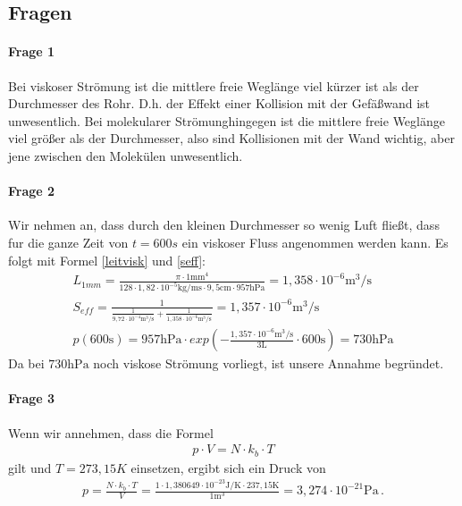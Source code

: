 \documentclass[11pt, a4paper]{article}
\begin{document}
    \subsection{Fragen}
    \paragraph{Frage 1}
    Bei viskoser Strömung ist die mittlere freie Weglänge viel kürzer ist als der Durchmesser des Rohr. D.h. der Effekt einer Kollision mit der Gefäßwand ist unwesentlich. Bei molekularer Strömunghingegen ist die mittlere freie Weglänge viel größer als der Durchmesser, also sind Kollisionen mit der Wand wichtig, aber jene zwischen den Molekülen unwesentlich.

    
    \paragraph{Frage 2}
    Wir nehmen an, dass durch den kleinen Durchmesser so wenig Luft fließt, dass fur die ganze Zeit von $t = 600s$ ein viskoser Fluss angenommen werden kann. Es folgt mit Formel \ref{leitvisk} und \ref{seff}:
    \begin{align}
        L_{1mm} = \frac{\pi \cdot 1 \si{\milli\meter}^4}{128 \cdot 1,82 \cdot 10^{-5} \si{\kilogram\per\milli\second} \cdot 9,5 \si{\centi\metre} \cdot 957 \si{\hecto\pascal}} = 1,358 \cdot 10^{-6} \si{\meter\cubed\per\second} \\
        S_{eff} = \frac{1}{\frac{1}{9,72 \cdot 10^{-4} \si{\meter\cubed\per\second}} + \frac{1}{1,358 \cdot 10^{-6} \si{\meter\cubed\per\second}}} = 1,357 \cdot 10^{-6} \si{\meter\cubed\per\second} \\
        p(600 \si{\second}) = 957 \si{\hecto\pascal} \cdot exp\left(-\frac{1,357 \cdot 10^{-6} \si{\meter\cubed\per\second}}{3 \si{\liter}} \cdot 600 \si{\second}\right) = 730 \si{\hecto\pascal}
    \end{align}
    Da bei $730 \si{\hecto\pascal}$ noch viskose Strömung vorliegt, ist unsere Annahme begründet.

    \paragraph{Frage 3}
    Wenn wir annehmen, dass die Formel
    \begin{align}
        p \cdot V = N \cdot k_b \cdot T
    \end{align}
    gilt und $T = 273,15K$ einsetzen, ergibt sich ein Druck von
    \begin{align}
        p = \frac{N \cdot k_b \cdot T}{V} = \frac{1 \cdot 1,380649 \cdot 10^{-23} \si{\joule\per\kelvin} \cdot 237,15 \si{\kelvin}}{1 \si{\meter\cubed}} = 3,274 \cdot 10^{-21} \si{\pascal} \,.
    \end{align}

    
    
\end{document}

